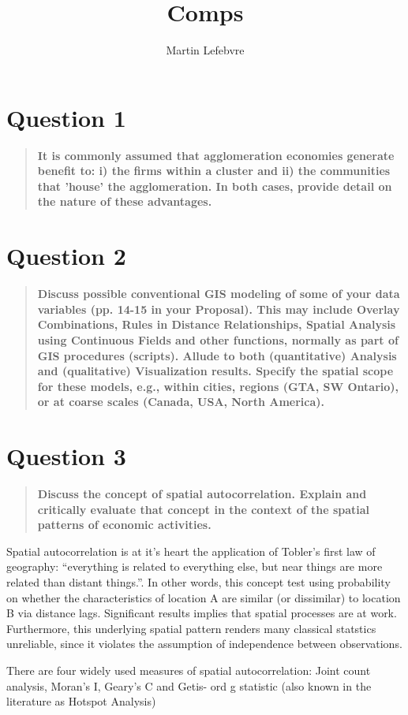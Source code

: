 \documentclass[12pt,letterpaper,notitlepage,onecolumn,final,openbib]{article}
\author{Martin Lefebvre}
\title{Comps}
\begin{document}
	
\section{Question 1}
\begin{quotation}
\textbf{It is commonly assumed that agglomeration economies generate benefit to: i) the firms within a cluster and ii) the communities that 'house' the agglomeration. In both cases, provide detail on the nature of these advantages.}
\end{quotation}
\section{Question 2}
\begin{quotation}
\textbf{Discuss possible conventional GIS modeling of some of your data variables (pp. 14-15 in your Proposal). This may include Overlay Combinations, Rules in Distance Relationships, Spatial Analysis using Continuous Fields and other functions, normally as part of GIS procedures (scripts). Allude to both (quantitative) Analysis and (qualitative) Visualization results. Specify the spatial scope for these models, e.g., within cities, regions (GTA, SW Ontario), or at coarse scales (Canada, USA, North America).}
\end{quotation}
\section{Question 3}
\begin{quotation}
\textbf{Discuss the concept of spatial autocorrelation. Explain and critically evaluate that concept in the context of the spatial patterns of economic activities.}
\end{quotation}

Spatial autocorrelation is at it's heart the application of Tobler's first law of geography: ``everything is related to everything else, but near things are more related than distant things.''\cite[page  236]{toblera1970}.  In other words, this concept test using probability on whether the characteristics of location A are similar (or dissimilar) to location B via distance lags.   Significant results implies that spatial processes are at work.  Furthermore, this underlying spatial pattern renders many classical statstics unreliable, since it violates the assumption of independence between observations. 

There are four widely used measures of spatial autocorrelation: Joint count analysis, Moran's I, Geary's C and Getis- ord g statistic (also known in the literature as Hotspot Analysis)


	\pagebreak
	
	
\end{document}
